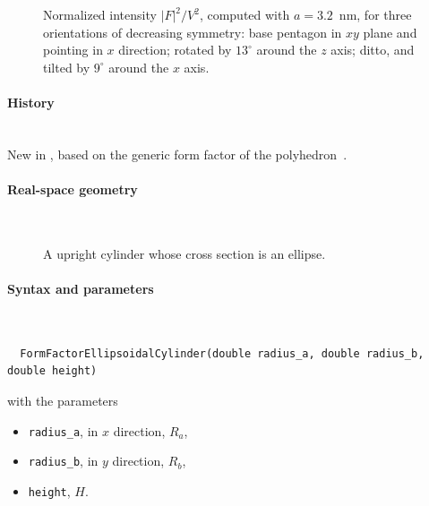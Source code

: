 \begin{figure}[H]
\begin{center}
\end{center}
\caption{Normalized intensity $|F|^2/V^2$,
computed with $a=3.2$~nm,
for three orientations of decreasing symmetry:
base pentagon in $xy$ plane and pointing in $x$ direction;
rotated by $13^\circ$ around the $z$ axis;
ditto, and tilted by $9^\circ$ around the $x$ axis.}
\end{figure}

\paragraph{History}\strut\\
New in ,
based on the generic form factor of the polyhedron~\cite{ba:ffp}.


 \label{SEllipsoidalCylinder}

\paragraph{Real-space geometry}\strut\\

\begin{figure}[H]
\hfill
{}
\hfill
{}
\hfill
{}
\hfill
\caption{A upright cylinder whose cross section is an ellipse.}
\end{figure}

\paragraph{Syntax and parameters}\strut\\[-2ex plus .2ex minus .2ex]
\begin{lstlisting}
  FormFactorEllipsoidalCylinder(double radius_a, double radius_b, double height)
\end{lstlisting}
with the parameters
\begin{itemize}
\item \texttt{radius\_a}, in $x$ direction, $R_a$,
\item \texttt{radius\_b}, in $y$ direction, $R_b$,
\item \texttt{height}, $H$.
\end{itemize}

